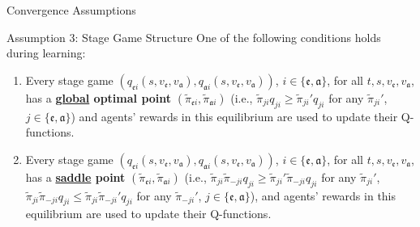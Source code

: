 \documentclass[10pt, aspectratio=169]{beamer}
\newcommand{\evidenzia}[1]{\textcolor{verdeSalvia}{\textbf{#1}}}
\begin{document}
\begin{frame}{Convergence Assumptions}
    \begin{block}{Assumption 3: Stage Game Structure}
        One of the following conditions holds during learning: 
        \begin{enumerate}
            \item Every stage game $(q_{\mathfrak{e}i}(s, v_{\mathfrak{e}}, v_{\mathfrak{a}}), q_{\mathfrak{a}i}(s, v_{\mathfrak{e}}, v_{\mathfrak{a}}))$, $i \in \{\mathfrak{e}, \mathfrak{a}\}$, for all $t, s, v_{\mathfrak{e}}, v_{\mathfrak{a}}$, has a \evidenzia{\underline{global} optimal point} $(\tilde{\pi}_{\mathfrak{e}i}, \tilde{\pi}_{\mathfrak{a}i})$ (i.e., $\tilde{\pi}_{ji}q_{ji} \geq \tilde{\pi}_{ji}'q_{ji}$ for any $\tilde{\pi}_{ji}'$, $j \in \{\mathfrak{e}, \mathfrak{a}\}$) and agents' rewards in this equilibrium are used to update their Q-functions. 
            \item Every stage game $(q_{\mathfrak{e}i}(s, v_{\mathfrak{e}}, v_{\mathfrak{a}}), q_{\mathfrak{a}i}(s, v_{\mathfrak{e}}, v_{\mathfrak{a}}))$, $i \in \{\mathfrak{e}, \mathfrak{a}\}$, for all $t, s, v_{\mathfrak{e}}, v_{\mathfrak{a}}$, has a \evidenzia{\underline{saddle} point} $(\tilde{\pi}_{\mathfrak{e}i}, \tilde{\pi}_{\mathfrak{a}i})$ (i.e., $\tilde{\pi}_{ji}\tilde{\pi}_{-ji}q_{ji} \geq \tilde{\pi}_{ji}'\tilde{\pi}_{-ji}q_{ji}$ for any $\tilde{\pi}_{ji}'$, $\tilde{\pi}_{ji}\tilde{\pi}_{-ji}q_{ji} \leq \tilde{\pi}_{ji}\tilde{\pi}_{-ji}'q_{ji}$ for any $\tilde{\pi}_{-ji}'$, $j \in \{\mathfrak{e}, \mathfrak{a}\}$), and agents' rewards in this equilibrium are used to update their Q-functions. 
        \end{enumerate}
    \end{block}


\end{frame}

\end{document}
